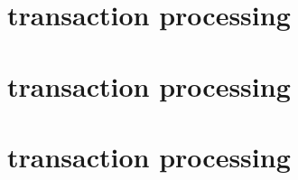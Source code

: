 \section{\sysi{} transaction processing}     \label{txn data: processing: sysi transaction processing}   
\section{\user{} transaction processing}     \label{txn data: processing: user transaction processing}   
\section{\sysf{} transaction processing}     \label{txn data: processing: sysf transaction processing}   

